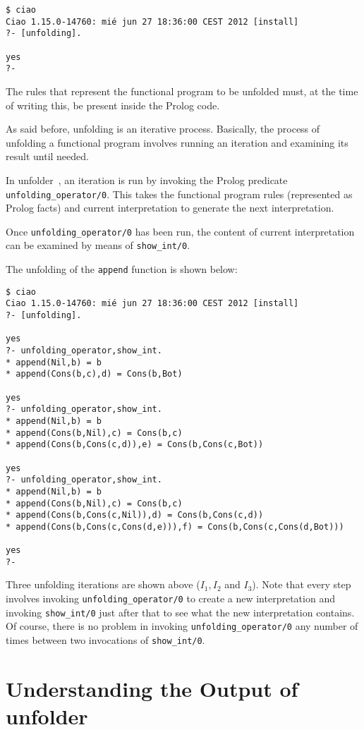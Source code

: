 \documentclass[11pt,a4paper,twoside,openright]{book}
\newcommand{\unfolder}{{\textsf{unfolder~}}}
\begin{document}
\begin{verbatim}
$ ciao
Ciao 1.15.0-14760: mié jun 27 18:36:00 CEST 2012 [install]
?- [unfolding].

yes
?-
\end{verbatim}

The rules that represent the functional program to be unfolded must,
at the time of writing this, be present inside the Prolog code.

As said before, unfolding is an iterative process. Basically, the
process of unfolding a functional program involves running an
iteration and examining its result until needed.

In \unfolder, an iteration is run by invoking the Prolog predicate \\
{\tt unfolding\_operator/0}. This takes the functional program
rules (represented as Prolog facts) and current interpretation to
generate the next interpretation.

Once {\tt unfolding\_operator/0} has been run, the content of current
interpretation can be examined by means of {\tt show\_int/0}.

The unfolding of the {\tt append} function is shown below:

\begin{verbatim}
$ ciao
Ciao 1.15.0-14760: mié jun 27 18:36:00 CEST 2012 [install]
?- [unfolding].

yes
?- unfolding_operator,show_int.
* append(Nil,b) = b
* append(Cons(b,c),d) = Cons(b,Bot)

yes
?- unfolding_operator,show_int.
* append(Nil,b) = b
* append(Cons(b,Nil),c) = Cons(b,c)
* append(Cons(b,Cons(c,d)),e) = Cons(b,Cons(c,Bot))

yes
?- unfolding_operator,show_int.
* append(Nil,b) = b
* append(Cons(b,Nil),c) = Cons(b,c)
* append(Cons(b,Cons(c,Nil)),d) = Cons(b,Cons(c,d))
* append(Cons(b,Cons(c,Cons(d,e))),f) = Cons(b,Cons(c,Cons(d,Bot)))

yes
?-
\end{verbatim}  

\noindent
Three unfolding iterations are shown above ($I_1, I_2$ and $I_3$). Note
that every step involves invoking {\tt unfolding\_operator/0} to
create a new interpretation and invoking {\tt show\_int/0} just after
that to see what the new interpretation contains. Of course, there is
no problem in invoking {\tt unfolding\_operator/0} any number of times
between two invocations of {\tt show\_int/0}.

\section{Understanding the Output of \unfolder}
\end{document}
